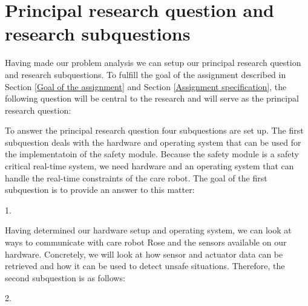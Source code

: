 \documentclass[12pt]{scrreprt}
\begin{document}
\section{Principal research question and research subquestions}
\label{Principal research question and research subquestions}
Having made our problem analysis we can setup our principal research question and research subquestions. To fulfill the goal of the assignment described in Section \ref{Goal of the assignment} and Section \ref{Assignment specification}, the following question will be central to the research and will serve as the principal research question:

\begin{flushleft}
\textit{\mq}
\end{flushleft}

To answer the principal research question four subquestions are set up. The first subquestion deals with the hardware and operating system that can be used for the implementatoin of the safety module. Because the safety module is a safety critical real-time system, we need hardware and an operating system that can handle the real-time constraints of the care robot. The goal of the first subquestion is to provide an answer to this matter:

\begin{flushleft}
1. \textit{\sqone}
\end{flushleft}

%

Having determined our hardware setup and operating system, we can look at ways to communicate with care robot Rose and the sensors available on our hardware. Concretely, we will look at how sensor and actuator data can be retrieved and how it can be used to detect unsafe situations. Therefore, the second subquestion is as follows:

\begin{flushleft}
2. \textit{\sqtwo}
\end{flushleft}
\end{document}
